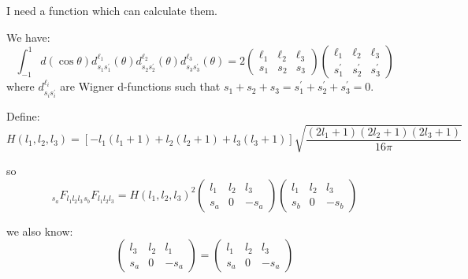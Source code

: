 \documentclass[11pt]{article}
\begin{document}
I need a function which can calculate them.

We have:
\begin{equation}
\int_{-1}^{1} d(\cos \theta) d_{s_{1} s_{1}^{\prime}}^{\ell_{1}}(\theta) d_{s_{2} s_{2}^{\prime}}^{\ell_{2}}(\theta) d_{s_{3} s_{3}^{\prime}}^{\ell_{3}}(\theta)=2 \left( \begin{array}{ccc}{\ell_{1}} & {\ell_{2}} & {\ell_{3}} \\ {s_{1}} & {s_{2}} & {s_{3}}\end{array}\right) \left( \begin{array}{ccc}{\ell_{1}} & {\ell_{2}} & {\ell_{3}} \\ {s_{1}^{\prime}} & {s_{2}^{\prime}} & {s_{3}^{\prime}}\end{array}\right)
\end{equation}
where $d_{s_{i} s_{i}^{\prime}}^{\ell_{i}}$ are Wigner d-functions such that $s_{1}+s_{2}+s_{3}=s_{1}^{\prime}+s_{2}^{\prime}+s_{3}^{\prime}=0$.


Define:
\begin{equation}
H(l_{1},l_{2},l_{3})=\left[-l_{1}(l_{1}+1)+l_{2}(l_{2}+1)+l_{3}(l_{3}+1)\right]\sqrt{\frac{(2 l_{1}+1)(2 l_{2}+1)\left(2 l_{3}+1\right)}{16 \pi}}
\end{equation}

so
\begin{equation}
_{s_{a}} F_{l_{1} l_{2} l_{3}}{_{s_{b}} F_{l_{1} l_{2} l_{3}}}=H(l_{1},l_{2},l_{3})^2{\left( \begin{array}{ccc}{l_{1}} & {l_{2}} & {l_{3}} \\ {s_{a} } & {0} & {-s_{a}}\end{array}\right)}{\left( \begin{array}{ccc}{l_{1}} & {l_{2}} & {l_{3}} \\ {s_{b} } & {0} & {-s_{b}}\end{array}\right)}
\end{equation}

we also know:
\begin{equation}
\left( \begin{array}{ccc}{l_{3}} & {l_{2}} & {l_{1}} \\ {s_{a}} & {0} & {-s_{a}}\end{array}\right)=\left( \begin{array}{ccc}{l_{1}} & {l_{2}} & {l_{3}} \\ {s_{a}} & {0} & {-s_{a}}\end{array}\right)
\end{equation}
\end{document}
